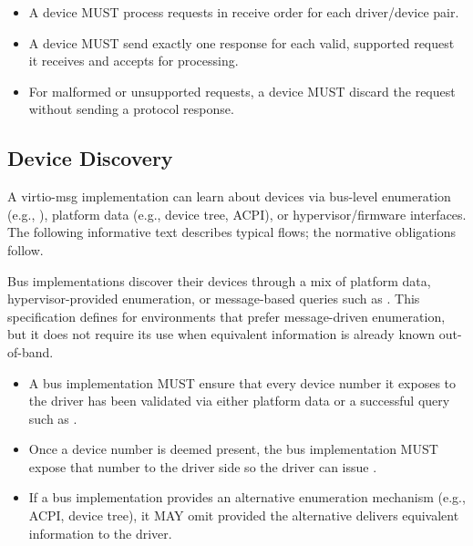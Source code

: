 \begin{itemize}
  \item A device MUST process requests in receive order for each driver/device
        pair.
  \item A device MUST send exactly one response for each valid, supported
        request it receives and accepts for processing.
  \item For malformed or unsupported requests, a device MUST discard the
        request without sending a protocol response.
\end{itemize}

\subsection{Device Discovery}\label{sec:Virtio Transport Options / Virtio Over Messages / Device Discovery}

A virtio-msg implementation can learn about devices via bus-level enumeration
(e.g., ), platform data (e.g., device tree, ACPI), or
hypervisor/firmware interfaces. The following informative text describes
typical flows; the normative obligations follow.

Bus implementations discover their devices through a mix of platform data,
hypervisor-provided enumeration, or message-based queries such as
. This specification defines  for
environments that prefer message-driven enumeration, but it does not require
its use when equivalent information is already known out-of-band.

\begin{itemize}
  \item A bus implementation MUST ensure that every device number it exposes to
        the driver has been validated via either platform data or a successful
        query such as .
  \item Once a device number is deemed present, the bus implementation MUST
        expose that number to the driver side so the driver can issue
        .
  \item If a bus implementation provides an alternative enumeration mechanism
        (e.g., ACPI, device tree), it MAY omit  provided the
        alternative delivers equivalent information to the driver.
\end{itemize}

